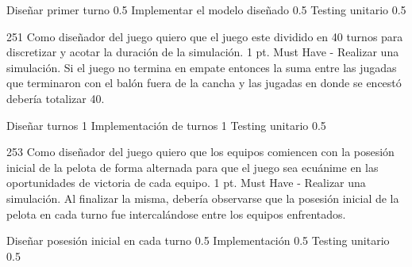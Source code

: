 \begin{taskstable}
 \task
 {Diseñar primer turno}
 {0.5}
 \task
 {Implementar el modelo diseñado}
 {0.5}
 \task
 {Testing unitario}
 {0.5}
\end{taskstable}

\vspace{1cm}


\sprintstory
{251}
{Como diseñador del juego quiero que el juego este dividido en 40 turnos para discretizar y acotar la duración de la simulación.}
{1 pt.}
{Must Have}
{-}
{Realizar una simulación. Si el juego no termina en empate entonces la suma entre las jugadas que terminaron con el balón fuera de la cancha y las jugadas en donde se encestó debería totalizar 40.}

\begin{taskstable}
 \task
 {Diseñar turnos}
 {1}
 \task
 {Implementación de turnos}
 {1}
 \task
 {Testing unitario}
 {0.5}
\end{taskstable}

\vspace{1cm}


\sprintstory
{253}
{Como diseñador del juego quiero que los equipos comiencen con la posesión inicial de la pelota de forma alternada para que el juego sea ecuánime en las oportunidades de victoria de cada equipo.}
{1 pt.}
{Must Have}
{-}
{Realizar una simulación. Al finalizar la misma, debería observarse que la posesión inicial de la pelota en cada turno fue intercalándose entre los equipos enfrentados.}

\begin{taskstable}
 \task
 {Diseñar posesión inicial en cada turno}
 {0.5}
 \task
 {Implementación}
 {0.5}
 \task
 {Testing unitario}
 {0.5}
\end{taskstable}

\vspace{1cm}


